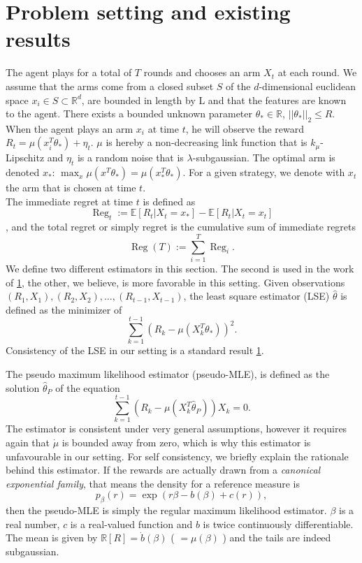 \documentclass[twoside]{article} \usepackage{aistats2017}
\newcommand{\Reg} {
  \operatorname{Reg}}
\begin{document}
\section{Problem setting and existing results}
The agent plays for a total of $T$ rounds and chooses an arm $X_t$ at each round. 
We assume that the arms come from a closed subset $S$ of the $d$-dimensional euclidean space $x_i \in S\subset\mathbb{R}^d$, are bounded in length by L and that the features are known to the agent.
There exists a bounded unknown parameter $\theta_*\in \mathbb{R}$, $||\theta_*||_2 \leq R$.
When the agent plays an arm $x_i$ at time $t$, he will observe the reward $R_t = \mu(x_i^T\theta_*) +\eta_t$. $\mu$ is hereby a non-decreasing link function that is $k_\mu$-Lipschitz and $\eta_t$ is a random noise that is $\lambda$-subgaussian. The optimal arm is denoted $x_*$: $\max_x\mu(x^T\theta_*) = \mu(x_*^T\theta_*)$. For a given strategy, we denote with $x_t$ the arm that is chosen at time $t$.\\
The immediate regret at time $t$ is defined as 
$$\Reg_t := \mathbb{E}\left[R_t|X_t=x_*\right]-\mathbb{E}\left[R_t|X_t=x_t\right]$$,
and the total regret or simply regret is the cumulative sum of immediate regrets
$$\Reg(T) := \sum_{i=1}^T \Reg_i.$$
We define two different estimators in this section.
The second is used in the work of \ref{}, the other, we believe, is more favorable in this setting.
Given observations $(R_1,X_1), (R_2,X_2),\ldots,(R_{t-1},X_{t-1})$, the least square estimator (LSE) $\hat{\theta}$ is defined as the minimizer of
$$\sum_{k=1}^{t-1}\left(R_k - \mu(X_k^T\theta_*)\right)^2.$$
Consistency of the LSE in our setting is a standard result \ref{}.

The pseudo maximum likelihood estimator (pseudo-MLE), is defined as the solution $\hat{\theta}_P$ of the equation
$$\sum_{k=1}^{t-1}(R_k-\mu(X_k^T\hat{\theta}_P))X_k = 0.$$
The estimator is consistent under very general assumptions, however it requires again that $\dot{\mu}$ is bounded away from zero, which is why this estimator is unfavourable in our setting.
For self consistency, we briefly explain the rationale behind this estimator.
If the rewards are actually drawn from a \textit{canonical exponential family}, that means the density for a reference measure is
$$p_\beta(r) = \exp(r\beta − b(\beta) + c(r)) ,$$
then the pseudo-MLE is simply the regular maximum likelihood estimator. $\beta$ is a real number, $c$ is a real-valued function and $b$ is twice continuously differentiable. The mean is given by $\mathbb{R}[R] = \dot{b}(\beta)$ ( $=\mu(\beta)$ ) and the tails are indeed subgaussian. 
\end{document}
